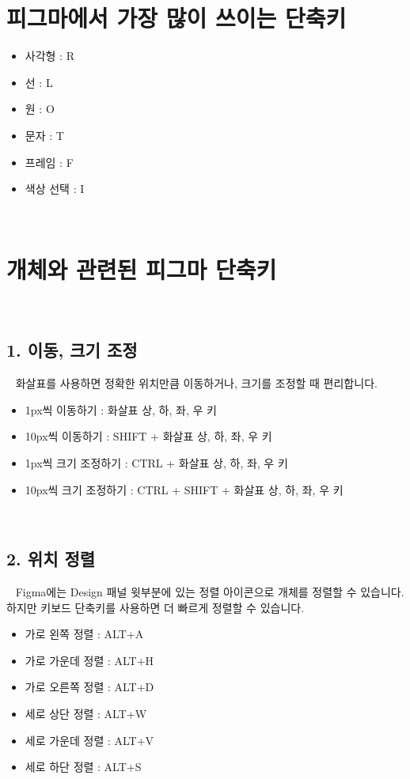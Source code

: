 \documentclass[12pt, a4paper, oneside]{book}
\begin{document}
	\section{피그마에서 가장 많이 쓰이는 단축키}


			\begin{itemize}[topsep=0.0em, parsep=0.0em, itemsep=0em, leftmargin=6.0em, labelwidth=3em, labelsep=1em] 
			\item 	사각형 : R
			\item 	선 : L
			\item 	원 : O
			\item 	문자 : T
			\item 	프레임 : F
			\item 	색상 선택 : I
			\end{itemize}
 


	\section{개체와 관련된 피그마 단축키}
 
	\subsection{1. 이동, 크기 조정}
 
화살표를 사용하면 정확한 위치만큼 이동하거나, 크기를 조정할 때 편리합니다.

			\begin{itemize}[topsep=0.0em, parsep=0.0em, itemsep=0em, leftmargin=6.0em, labelwidth=3em, labelsep=1em] 
			\item 	1px씩 이동하기 : 화살표 상, 하, 좌, 우 키
			\item 	10px씩 이동하기 : SHIFT + 화살표 상, 하, 좌, 우 키
			\item 	1px씩 크기 조정하기 : CTRL + 화살표 상, 하, 좌, 우 키
			\item 	10px씩 크기 조정하기 : CTRL + SHIFT + 화살표 상, 하, 좌, 우 키
			\end{itemize}


 


	\subsection{2. 위치 정렬}
 
Figma에는 Design 패널 윗부분에 있는 정렬 아이콘으로 개체를 정렬할 수 있습니다. 하지만 키보드 단축키를 사용하면 더 빠르게 정렬할 수 있습니다.
 

			\begin{itemize}[topsep=0.0em, parsep=0.0em, itemsep=0em, leftmargin=6.0em, labelwidth=3em, labelsep=1em] 
			\item 	가로 왼쪽 정렬 : ALT+A
			\item 	가로 가운데 정렬 : ALT+H
			\item 	가로 오른쪽 정렬 : ALT+D
			\item 	세로 상단 정렬 : ALT+W
			\item 	세로 가운데 정렬 : ALT+V
			\item 	세로 하단 정렬 : ALT+S
			\end{itemize}
\end{document}
